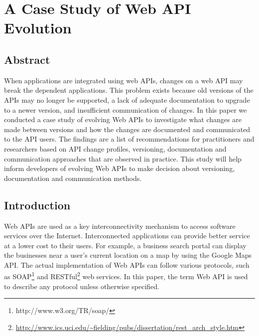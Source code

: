 \usetikzlibrary{backgrounds}
    \label{fig:screenshot_response}
\pgfplotsset{compat=1.5}


\chapter{A Case Study of Web API Evolution}
\label{chapter:case_study}


\section{Abstract}
When applications are integrated using web APIs, changes on a web API may break the dependent applications. This problem exists because old versions of the APIs may no longer be supported, a lack of adequate documentation to upgrade to a newer version, and insufficient communication of changes. In this paper we conducted a case study of evolving Web APIs to investigate what changes are made between versions and how the changes are documented and communicated to the API users. The findings are a list of recommendations for practitioners and researchers based on API change profiles, versioning, documentation and communication approaches that are observed in practice. This study will help inform developers of evolving Web APIs to make decision about versioning, documentation and communication methods.



\section{Introduction}

Web APIs are used as a key interconnectivity mechanism to access software services over the Internet. Interconnected applications can provide better service at a lower cost to their users. For example, a business search portal can display the businesses near a user's current location on a map by using the Google Maps API. The actual implementation of Web APIs can follow various protocols, such as SOAP\footnote{http://www.w3.org/TR/soap/} and RESTful\footnote{\url{http://www.ics.uci.edu/~fielding/pubs/dissertation/rest_arch_style.htm}} web services. In this paper, the term Web API is used to describe any protocol unless otherwise specified.

